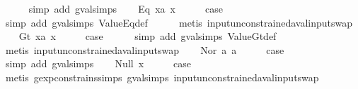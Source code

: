 \begin{isabellebody}
\ \ \ \ \isamarkupfalse%
\ {\isacharparenleft}simp\ add{\isacharcolon}\ gval{\isachardot}simps{\isacharparenleft}{}{\isacharparenright}{\isacharparenright}\isanewline
{}\isamarkupfalse%
\isanewline
\ \ \isamarkupfalse%
\ {\isacharparenleft}Eq\ x{}a\ x{}{\isacharparenright}\isanewline
\ \ \isamarkupfalse%
\ \isamarkupfalse%
\ {\isacharquery}case\isanewline
\ \ \ \ \isamarkupfalse%
\ {\isacharparenleft}simp\ add{\isacharcolon}\ gval{\isachardot}simps\ ValueEq{\isacharunderscore}def{\isacharparenright}\isanewline
\ \ \ \ \isamarkupfalse%
\ {\isacharparenleft}metis\ input{\isacharunderscore}unconstrained{\isacharunderscore}aval{\isacharunderscore}input{\isacharunderscore}swap{\isacharparenright}\isanewline
{}\isamarkupfalse%
\isanewline
\ \ \isamarkupfalse%
\ {\isacharparenleft}Gt\ x{}a\ x{}{\isacharparenright}\isanewline
\ \ \isamarkupfalse%
\ \isamarkupfalse%
\ {\isacharquery}case\isanewline
\ \ \ \ \isamarkupfalse%
\ {\isacharparenleft}simp\ add{\isacharcolon}\ gval{\isachardot}simps\ ValueGt{\isacharunderscore}def{\isacharparenright}\isanewline
\ \ \ \ \isamarkupfalse%
\ {\isacharparenleft}metis\ input{\isacharunderscore}unconstrained{\isacharunderscore}aval{\isacharunderscore}input{\isacharunderscore}swap{\isacharparenright}\isanewline
{}\isamarkupfalse%
\isanewline
\ \ \isamarkupfalse%
\ {\isacharparenleft}Nor\ a{}\ a{}{\isacharparenright}\isanewline
\ \ \isamarkupfalse%
\ \isamarkupfalse%
\ {\isacharquery}case\isanewline
\ \ \ \ \isamarkupfalse%
\ {\isacharparenleft}simp\ add{\isacharcolon}\ gval{\isachardot}simps{\isacharparenleft}{}{\isacharparenright}{\isacharparenright}\isanewline
{}\isamarkupfalse%
\isanewline
\ \ \isamarkupfalse%
\ {\isacharparenleft}Null\ x{\isacharparenright}\isanewline
\ \ \isamarkupfalse%
\ \isamarkupfalse%
\ {\isacharquery}case\isanewline
\ \ \ \ \isamarkupfalse%
\ {\isacharparenleft}metis\ gexp{\isacharunderscore}constrains{\isachardot}simps{\isacharparenleft}{}{\isacharparenright}\ gval{\isachardot}simps{\isacharparenleft}{}{\isacharparenright}\ input{\isacharunderscore}unconstrained{\isacharunderscore}aval{\isacharunderscore}input{\isacharunderscore}swap{\isacharparenright}\isanewline

\end{isabellebody}
